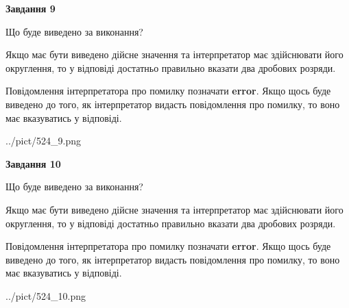 \documentclass[12pt, ukrainian]{article}
\begin{document}
{\begin {Large}
{\begin {center}\textbf{Завдання 9}\end {center}}\par
Що буде виведено за виконання? \par

Якщо має бути виведено дійсне значення та інтерпретатор має здійснювати його округлення, 
то у відповіді достатньо правильно вказати два дробових розряди.

Повідомлення інтерпретатора про помилку позначати \textbf{error}.
Якщо щось буде виведено до того, як інтерпретатор видасть повідомлення про помилку, 
то воно має вказуватись у відповіді. \par

\begin{center}
	{../pict/524_9.png}
\end{center}
\newpage

{\begin {center}\textbf{Завдання 10}\end {center}}\par
Що буде виведено за виконання? \par

Якщо має бути виведено дійсне значення та інтерпретатор має здійснювати його округлення, 
то у відповіді достатньо правильно вказати два дробових розряди.

Повідомлення інтерпретатора про помилку позначати \textbf{error}.
Якщо щось буде виведено до того, як інтерпретатор видасть повідомлення про помилку, 
то воно має вказуватись у відповіді. \par

\begin{center}
	{../pict/524_10.png}
\end{center}
\newpage

\end {Large}}
\end{document}
